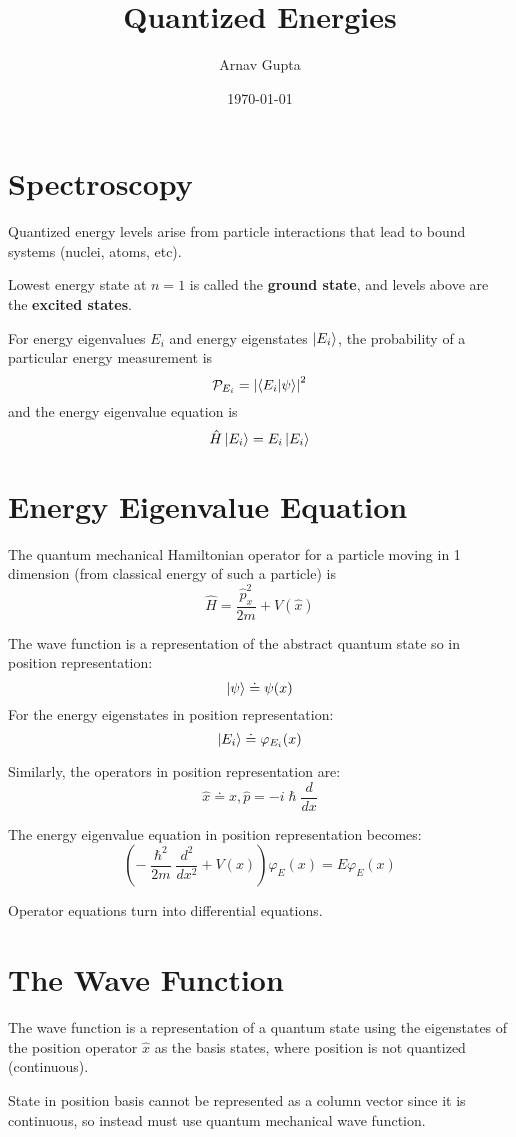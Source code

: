 \documentclass[11pt]{article}
\author{Arnav Gupta}
\date{\today}
\title{Quantized Energies}
\begin{document}
\maketitle
\tableofcontents

\section{Spectroscopy}
\label{sec:org1e92841}
Quantized energy levels arise from particle interactions that lead to bound systems (nuclei, atoms, etc).

Lowest energy state at \(n=1\) is called the \textbf{ground state}, and levels above are the \textbf{excited states}.

For energy eigenvalues \(E_{i}\) and energy eigenstates \(\ket{E_{i}}\), the probability of a particular
energy measurement is
$$
\mathcal{P}_{E_{i}} = \left| \braket{E_{i}| \psi} \right|^{2}
$$
and the energy eigenvalue equation is
$$
\hat{H} \ket{E_{i}} = E_{i} \ket{E_{i}}
$$
\section{Energy Eigenvalue Equation}
\label{sec:orgb168b27}
The quantum mechanical Hamiltonian operator for a particle moving in 1 dimension (from classical energy of
such a particle) is
$$
\hat{H} = \frac{\hat{p}_{x}^{2}}{2m} + V(\hat{x})
$$

The wave function is a representation of the abstract quantum state so in position representation:
$$
\ket{\psi} \doteq \psi(x)
$$
For the energy eigenstates in position representation:
$$
\ket{E_{i}} \doteq \varphi_{E_{i}}(x)
$$

Similarly, the operators in position representation are:
$$
\hat{x} \doteq x, \hat{p} = -i\hslash \frac{d}{dx}
$$

The energy eigenvalue equation in position representation becomes:
$$
\left( -\frac{\hslash^{2}}{2m} \frac{d^{2}}{dx^{2}} + V(x) \right) \varphi_{E}(x) = E\varphi_{E}(x)
$$

Operator equations turn into differential equations.
\section{The Wave Function}
\label{sec:orgdc1ef92}
The wave function is a representation of a quantum state using the eigenstates of the position
operator \(\hat{x}\) as the basis states, where position is not quantized (continuous).

State in position basis cannot be represented as a column vector since it is continuous, so instead
must use quantum mechanical wave function.
\end{document}

